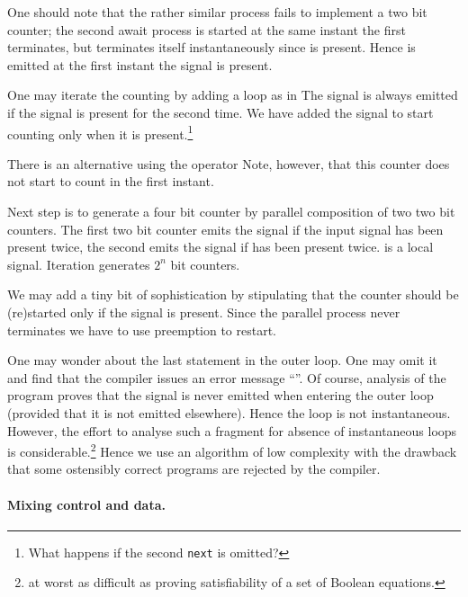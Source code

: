 One should note that the rather similar process
% 
% 
fails to implement a two bit counter; the second await process is
started at the same instant the first terminates, but terminates
itself instantaneously since  is present.  Hence 
is emitted at the first instant the signal  is present.

One may iterate the counting by adding a loop as in
%
%
The signal  is always emitted if the signal  is 
present for the second time. We have added the signal  to 
start counting only when it is present.\footnote{What happens if the 
second {\tt next} is omitted?}

There is an alternative using the  operator
% 
% 
Note, however, that this counter does not start to count in the first 
instant.


Next step is to generate a four bit counter by parallel composition 
of 
two two bit counters.
% 
%
The first two bit counter emits the signal  if the input
signal  has been present twice, the second emits the signal
 if  has been present twice.   is a
local signal. Iteration generates $2^n$ bit counters. 

We may add a tiny bit of sophistication by stipulating that the 
counter should be (re)started only if the signal  is 
present.
%
%
Since the parallel process never terminates we have to use preemption 
to restart. 

One may wonder about the last  statement in the outer loop. 
One may omit it and find that the compiler issues an error message 
``''. Of course, analysis of the program 
proves that the signal  is never emitted when entering 
the 
outer loop (provided that it is not emitted elsewhere). Hence the 
loop 
is not instantaneous. However, the effort to analyse 
such a fragment for absence of instantaneous loops is 
considerable.\footnote{at worst as difficult as proving 
satisfiability 
of a set of Boolean equations.} Hence we use an algorithm of low 
complexity with the drawback that some ostensibly correct programs 
are 
rejected by the compiler.


\paragraph{Mixing control and data.}

